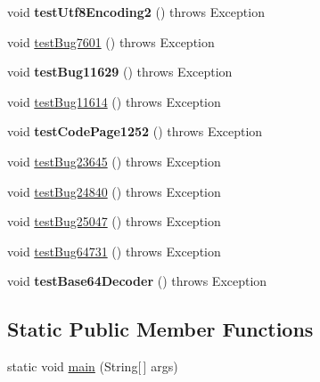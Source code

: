 \begin{DoxyCompactItemize}
void {\bfseries test\+Utf8\+Encoding2} ()  throws Exception 
\item 
void \mbox{\hyperlink{classtestsuite_1_1regression_1_1_string_regression_test_a7daa6aace5462393758a0ccdcb6dd4c9}{test\+Bug7601}} ()  throws Exception 
\item 
\mbox{\label{classtestsuite_1_1regression_1_1_string_regression_test_a9c6c23e956d2ffe160c366e399016309}} 
void {\bfseries test\+Bug11629} ()  throws Exception 
\item 
void \mbox{\hyperlink{classtestsuite_1_1regression_1_1_string_regression_test_a06cd6f2ea6096ebef7516e5ed1ff3659}{test\+Bug11614}} ()  throws Exception 
\item 
\mbox{\label{classtestsuite_1_1regression_1_1_string_regression_test_a4d94b374bdd0e09b4ecc7e541d5780ac}} 
void {\bfseries test\+Code\+Page1252} ()  throws Exception 
\item 
void \mbox{\hyperlink{classtestsuite_1_1regression_1_1_string_regression_test_a0b910fb41d304e6b938f8908dfffe0bf}{test\+Bug23645}} ()  throws Exception 
\item 
void \mbox{\hyperlink{classtestsuite_1_1regression_1_1_string_regression_test_a64fc08a013f1e23f5fcaaeecb3681aa5}{test\+Bug24840}} ()  throws Exception 
\item 
void \mbox{\hyperlink{classtestsuite_1_1regression_1_1_string_regression_test_a310d7878e44bc9bf13daa040be2bb847}{test\+Bug25047}} ()  throws Exception 
\item 
void \mbox{\hyperlink{classtestsuite_1_1regression_1_1_string_regression_test_a7e24a2a41964d76d3b5b82b5a064d820}{test\+Bug64731}} ()  throws Exception 
\item 
\mbox{\label{classtestsuite_1_1regression_1_1_string_regression_test_afb5ff96468558e939f5ae2548d75c06f}} 
void {\bfseries test\+Base64\+Decoder} ()  throws Exception 
\end{DoxyCompactItemize}
\subsection*{Static Public Member Functions}
\begin{DoxyCompactItemize}
\item 
static void \mbox{\hyperlink{classtestsuite_1_1regression_1_1_string_regression_test_ab7f0eee5f91473ea32fec25015ad945d}{main}} (String\mbox{[}$\,$\mbox{]} args)
\end{DoxyCompactItemize}
